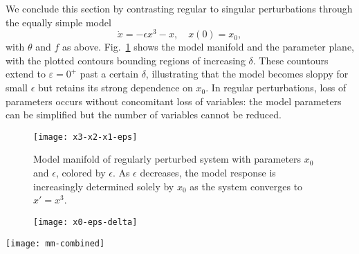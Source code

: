 We conclude this section by contrasting regular to singular
perturbations through the equally simple model
% 
\begin{equation}
  \dot{x} = -\epsilon x^3 - x,
  \quad
  x(0) = x_0 ,
  \label{1D-model-regpert}
\end{equation}
% 
with $\theta$ and $f$ as above.  Fig.~\ref{fig:reg-pert}
shows the model manifold and the parameter plane, with the plotted
contours bounding regions of increasing $\delta$.  These countours
extend to $\varepsilon = 0^+$ past a certain $\delta$, illustrating
that the model becomes sloppy for small $\epsilon$ but retains its strong
dependence on $x_0$.  In regular perturbations, loss of parameters
occurs without concomitant loss of variables: the model parameters can
be simplified but the number of variables cannot be reduced.

\begin{figure*}
  \centering
  \begin{subfigure}[t]{0.45\linewidth}
    \centering
    \texttt{[image: x3-x2-x1-eps]}
    \caption{Model manifold of regularly perturbed system with
      parameters $x_0$ and $\epsilon$, colored by $\epsilon$. As
      $\epsilon$ decreases, the model response is increasingly
      determined solely by $x_0$ as the system converges to
      $x' = x^3$. \label{fig:reg-pert} }
  \end{subfigure}
  \hspace{0.5cm}
  \begin{subfigure}[t]{0.45\linewidth}
    \centering
    \texttt{[image: x0-eps-delta]}
  \end{subfigure}
  \caption[Model manifold and parameter space of the regularly
  perturbed system]{Model manifold and parameter space of the
    regularly perturbed system \eqref{1D-model-regpert} with select
    $\delta$ contours \label{fig:reg-pert} }
\end{figure*}

\begin{figure*}[ht!]
  \centering
  \texttt{[image: mm-combined]}
  \caption[Quantitative illustration of mapping from parameter space
  to the model manifold]{Correspondence between parameter space (left)
    and the model manifold (right). At large values of $\epsilon$,
    rectangles in parameter space are mapped to skewed rectangles on
    the model manifold. At intermediate values of $\epsilon$, they are
    stretched into nearly one-dimensional segments. At small values
    where the system is singularly perturbed, patches in parameter
    space map to approximately the same point on the model manifold,
    the hallmark of sloppiness.}
\end{figure*}


